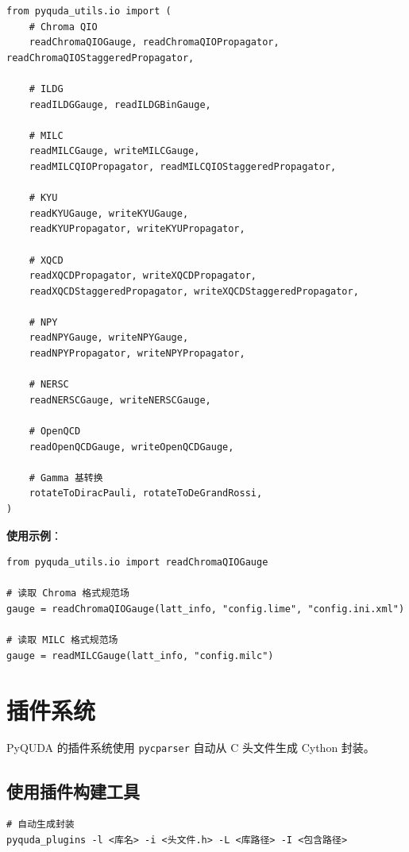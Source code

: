 \documentclass[12pt,a4paper]{ctexart}
\begin{document}
\begin{lstlisting}[style=pycode]
from pyquda_utils.io import (
    # Chroma QIO
    readChromaQIOGauge, readChromaQIOPropagator, readChromaQIOStaggeredPropagator,

    # ILDG
    readILDGGauge, readILDGBinGauge,

    # MILC
    readMILCGauge, writeMILCGauge,
    readMILCQIOPropagator, readMILCQIOStaggeredPropagator,

    # KYU
    readKYUGauge, writeKYUGauge,
    readKYUPropagator, writeKYUPropagator,

    # XQCD
    readXQCDPropagator, writeXQCDPropagator,
    readXQCDStaggeredPropagator, writeXQCDStaggeredPropagator,

    # NPY
    readNPYGauge, writeNPYGauge,
    readNPYPropagator, writeNPYPropagator,

    # NERSC
    readNERSCGauge, writeNERSCGauge,

    # OpenQCD
    readOpenQCDGauge, writeOpenQCDGauge,

    # Gamma 基转换
    rotateToDiracPauli, rotateToDeGrandRossi,
)
\end{lstlisting}

\textbf{使用示例}：
\begin{lstlisting}[style=pycode]
from pyquda_utils.io import readChromaQIOGauge

# 读取 Chroma 格式规范场
gauge = readChromaQIOGauge(latt_info, "config.lime", "config.ini.xml")

# 读取 MILC 格式规范场
gauge = readMILCGauge(latt_info, "config.milc")
\end{lstlisting}

\section{插件系统}

PyQUDA 的插件系统使用 \texttt{pycparser} 自动从 C 头文件生成 Cython 封装。

\subsection{使用插件构建工具}

\begin{lstlisting}[style=bashcode]
# 自动生成封装
pyquda_plugins -l <库名> -i <头文件.h> -L <库路径> -I <包含路径>
\end{lstlisting}
\end{document}
